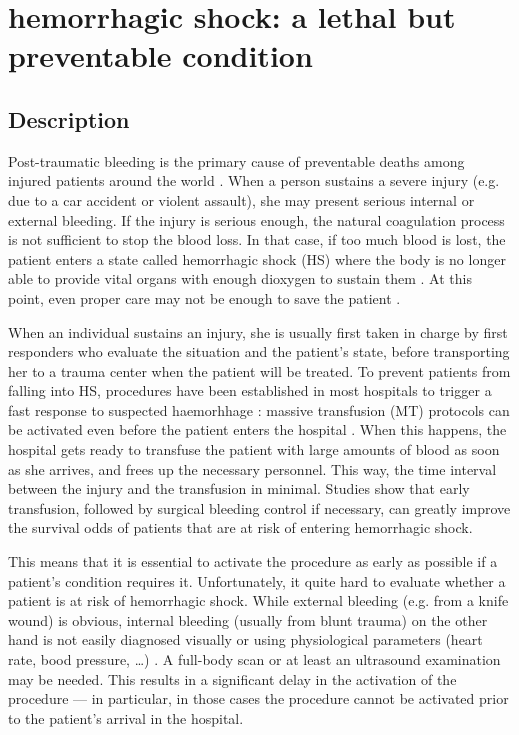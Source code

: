 	\section{hemorrhagic shock: a lethal but preventable condition}
	\label{shock}
		\subsection{Description}
Post-traumatic bleeding is the primary cause of preventable deaths among injured patients around the world \cite{WHO}\cite{urban}. When a person sustains a severe injury (e.g. due to a car accident or violent assault), she may present serious internal or external bleeding. If the injury is serious enough, the natural coagulation process is not sufficient to stop the blood loss. In that case, if too much blood is lost, the patient enters a state called hemorrhagic shock (HS) where the body is no longer able to provide vital organs with enough dioxygen to sustain them \cite{HS_def}. At this point, even proper care may not be enough to save the patient \cite{dutton2007current}.

When an individual sustains an injury, she is usually first taken in charge by first responders who evaluate the situation and the patient's state, before transporting her to a trauma center when the patient will be treated.
To prevent patients from falling into HS, procedures have been established in most hospitals to trigger a fast response to suspected haemorhhage \cite{pommerening2015gestalt}: massive transfusion (MT) protocols can be activated even before the patient enters the hospital \cite{malone2006MT}. When this happens, the hospital gets ready to transfuse the patient with large amounts of blood as soon as she arrives, and frees up the necessary personnel. This way, the time interval between the injury and the transfusion in minimal. Studies \cite{hoyt1994death} \cite{martin2009combatSupport} show that early transfusion, followed by surgical bleeding control if necessary, can greatly improve the survival odds of patients that are at risk of entering hemorrhagic shock.

This means that it is essential to activate the procedure as early as possible if a patient's condition requires it. Unfortunately, it quite hard to evaluate whether a patient is at risk of hemorrhagic shock\cite{pommerening2015gestalt}. While external bleeding (e.g. from a knife wound) is obvious, internal bleeding (usually from blunt trauma) on the other hand is not easily diagnosed visually or using physiological parameters (heart rate, bood pressure, \ldots) \cite{frank2010bloodLoss}. A full-body scan or at least an ultrasound examination may be needed\cite{perera2010rush}. This results in a significant delay in the activation of the procedure --- in particular, in those cases the procedure cannot be activated prior to the patient's arrival in the hospital.

